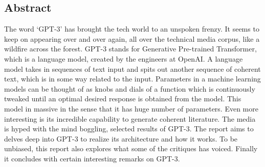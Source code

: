 \newpage
\vspace*{\fill}
\begin{center}
    \section*{Abstract}
\end{center}
The word `GPT-3' has brought the tech world to an unspoken frenzy. It seems to keep on appearing over and over again, all over the technical media corpus, like a wildfire across the forest. GPT-3 stands for Generative Pre-trained Transformer, which is a language model, created by the engineers at OpenAI. A language model takes in sequences of text input and spits out another sequence of coherent text, which is in some way related to the input. Parameters in a machine learning models can be thought of as knobs and dials of a function which is continuously tweaked until an optimal desired response is obtained from the model. This model in massive in the sense that it has huge number of parameters. Even more interesting is its incredible capability to generate coherent literature. The media is hyped with the mind boggling, selected results of GPT-3. The report aims to delves deep into GPT-3 to realize its architecture and how it works. To be unbiased, this report also explores what some of the critiques has voiced. Finally it concludes with certain interesting remarks on GPT-3.
\vspace*{\fill}